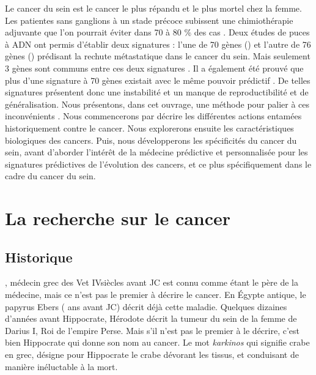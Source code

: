 		Le cancer du sein est le cancer le plus répandu et le plus mortel chez la femme.
		Les patientes sans ganglions à un stade précoce subissent une chimiothérapie adjuvante que l'on pourrait éviter dans 70 à 80 \% des cas \citep{Bertucci2002}.
		Deux études de puces à \acs{ADN} ont permis d'établir deux signatures : l'une de 70 gènes (\citet{vantveer2002}) et l'autre de 76 gènes (\citet{Wang2005}) prédisant la rechute métastatique dans le cancer du sein.
		Mais seulement 3 gènes sont communs entre ces deux signatures \citep{Chuang2007}.
		Il a également été prouvé que plus d'une signature à 70 gènes existait avec le même pouvoir prédictif \citep{EinDor2006}.
		De telles signatures présentent donc une instabilité et un manque de reproductibilité et de généralisation.
		Nous présentons, dans cet ouvrage, une méthode pour palier à ces inconvénients \citep{Garcia2011, Garcia2012, Garcia2013, Garcia2013b}.
		Nous commencerons par décrire les différentes actions entamées historiquement contre le cancer.
		Nous explorerons ensuite les caractéristiques biologiques des cancers.
		Puis, nous développerons les spécificités du cancer du sein, avant d'aborder l'intérêt de la médecine prédictive et personnalisée pour les signatures prédictives de l'évolution des cancers, et ce plus spécifiquement dans le cadre du cancer du sein.

	\section{\textcolor{red!45!black}{La recherche sur le cancer}}\label{sec:RechercheCancer}

		\subsection{\textcolor{red!45!black}{Historique}}\label{sub:Historique}
			, médecin grec des V\eme et IV\eme siècles avant JC est connu comme étant le père de la médecine, mais ce n'est pas le premier à décrire le cancer.
			En Égypte antique, le papyrus Ebers ( ans avant JC) décrit déjà cette maladie.
			Quelques dizaines d'années avant Hippocrate, Hérodote décrit la tumeur du sein de la femme de Darius I\er, Roi de l'empire Perse.
			Mais s'il n'est pas le premier à le décrire, c'est bien Hippocrate qui donne son nom au cancer.
			Le mot \textit{karkinos} qui signifie crabe en grec, désigne pour Hippocrate le crabe dévorant les tissus, et conduisant de manière inéluctable à la mort.

